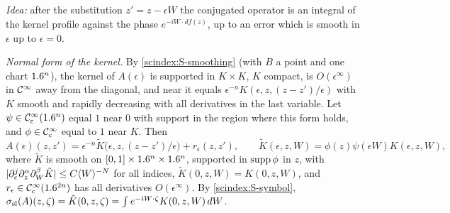 \subsection*{}

\emph{Idea:} after the substitution $z'=z-\epsilon W$ the conjugated operator is
an integral of the kernel profile against the phase $e^{-iW\cdot df(z)}$, up to an
error which is smooth in $\epsilon$ up to $\epsilon=0$.

\emph{Normal form of the kernel.} By \ref{scindex:S-smoothing} (with $B$ a point and
one chart $1.6^n$), the kernel of $A(\epsilon)$ is supported in $K\times K$, $K$
compact, is $O(\epsilon^\infty)$ in $\mathcal{C}^\infty$ away from the diagonal, and near it equals
$\epsilon^{-n}K(\epsilon,z,(z-z')/\epsilon)$ with $K$ smooth and rapidly
decreasing with all derivatives in the last variable. Let $\psi\in\mathcal{C}^\infty_{\mathrm{c}}(1.6^n)$ equal
$1$ near $0$ with support in the region where this form holds, and $\phi\in\mathcal{C}^\infty_{\mathrm{c}}$
equal to $1$ near $K$. Then
\begin{equation*}
  A(\epsilon)(z,z')=\epsilon^{-n}\tilde K\bigl(\epsilon,z,(z-z')/\epsilon\bigr)
  +r_\epsilon(z,z'),\qquad\tilde K(\epsilon,z,W)=\phi(z)\psi(\epsilon W)
  K(\epsilon,z,W),
\end{equation*}
where $\tilde K$ is smooth on $[0,1]\times1.6^n\times1.6^n$, supported in
$\operatorname{supp}\phi$ in $z$, with $\lvert \partial_\epsilon^j\partial_z^\alpha\partial_W^\beta\tilde K\rvert\le
C\langle W\rangle^{-N}$ for all indices, $\tilde K(0,z,W)=K(0,z,W)$, and
$r_\epsilon\in\mathcal{C}^\infty_{\mathrm{c}}(1.6^{2n})$ has all derivatives $O(\epsilon^\infty)$. By
\ref{scindex:S-symbol}, $\sigma_{\mathrm{sl}}(A)(z,\zeta)=\hat K(0,z,\zeta)=\int e^{-iW\cdot\zeta}
K(0,z,W)\,dW$.

